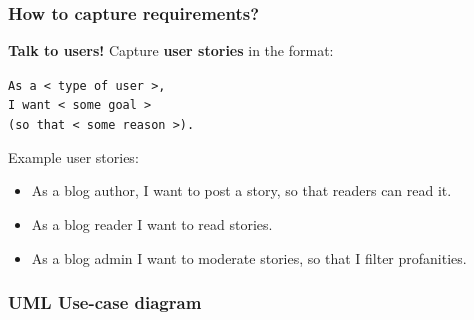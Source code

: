 \documentclass{beamer} %
\newcommand\emc[1]{\textcolor{brightblue}{\textbf{#1}}}
\begin{document}
\begin{frame}

\frametitle{How to capture requirements?}

\emc{Talk to users!} Capture \emc{user stories} in the format:

\begin{center}
 \small \texttt{As a < type of user >, \\ I want < some goal > \\ (so that < some reason >).}
\end{center}

\vspace{3mm}
Example user stories:
\begin{itemize}
  \item As a blog author, I want to post a story, so that readers can read it.
  \item As a blog reader I want to read stories.
  \item As a blog admin I want to moderate stories, so that I filter profanities.
\end{itemize}

\end{frame}


\begin{frame}

\frametitle{UML Use-case diagram}

\begin{center}
\end{center}

\end{frame}
\end{document}
